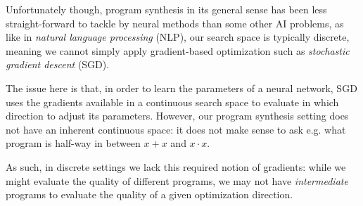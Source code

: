 \documentclass{article}
\begin{document}
Unfortunately though, program synthesis in its general sense has been less straight-forward to tackle by neural methods than some other AI problems,
as like in \emph{natural language processing} (NLP),
our search space is typically discrete, meaning we cannot simply apply gradient-based optimization such as \emph{stochastic gradient descent} (SGD).~\citep{nps}

The issue here is that, in order to learn the parameters of a neural network, SGD uses the gradients available in a continuous search space to evaluate in which direction to adjust its parameters.
However, our program synthesis setting does not have an inherent continuous space:
it does not make sense to ask e.g. what program is half-way in between $x+x$ and $x \cdot x$.

As such, in discrete settings we lack this required notion of gradients:
while we might evaluate the quality of different programs,
we may not have \emph{intermediate} programs to evaluate the quality of a given optimization direction.
\end{document}

